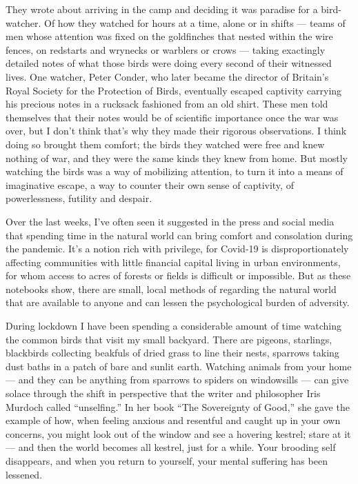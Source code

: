 They wrote about arriving in the camp and deciding it was paradise for a
bird-watcher. Of how they watched for hours at a time, alone or in
shifts --- teams of men whose attention was fixed on the goldfinches
that nested within the wire fences, on redstarts and wrynecks or
warblers or crows --- taking exactingly detailed notes of what those
birds were doing every second of their witnessed lives. One watcher,
Peter Conder, who later became the director of Britain's Royal Society
for the Protection of Birds, eventually escaped captivity carrying his
precious notes in a rucksack fashioned from an old shirt. These men told
themselves that their notes would be of scientific importance once the
war was over, but I don't think that's why they made their rigorous
observations. I think doing so brought them comfort; the birds they
watched were free and knew nothing of war, and they were the same kinds
they knew from home. But mostly watching the birds was a way of
mobilizing attention, to turn it into a means of imaginative escape, a
way to counter their own sense of captivity, of powerlessness, futility
and despair.

Over the last weeks, I've often seen it suggested in the press and
social media that spending time in the natural world can bring comfort
and consolation during the pandemic. It's a notion rich with privilege,
for Covid-19 is disproportionately affecting communities with little
financial capital living in urban environments, for whom access to acres
of forests or fields is difficult or impossible. But as these notebooks
show, there are small, local methods of regarding the natural world that
are available to anyone and can lessen the psychological burden of
adversity.

During lockdown I have been spending a considerable amount of time
watching the common birds that visit my small backyard. There are
pigeons, starlings, blackbirds collecting beakfuls of dried grass to
line their nests, sparrows taking dust baths in a patch of bare and
sunlit earth. Watching animals from your home --- and they can be
anything from sparrows to spiders on windowsills --- can give solace
through the shift in perspective that the writer and philosopher Iris
Murdoch called ``unselfing.'' In her book ``The Sovereignty of Good,''
she gave the example of how, when feeling anxious and resentful and
caught up in your own concerns, you might look out of the window and see
a hovering kestrel; stare at it --- and then the world becomes all
kestrel, just for a while. Your brooding self disappears, and when you
return to yourself, your mental suffering has been lessened.

